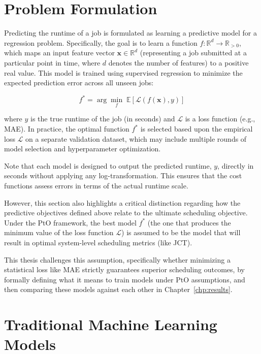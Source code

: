\section{Problem Formulation}
\label{sec:formulation}

Predicting the runtime of a job is formulated as learning a predictive model for a regression problem. Specifically, the goal is to learn a function $f: \mathbb{R}^d \rightarrow \mathbb{R}_{>0}$, which maps an input feature vector $\mathbf{x} \in \mathbb{R}^d$ (representing a job submitted at a particular point in time, where $d$ denotes the number of features) to a positive real value. This model is trained using supervised regression to minimize the expected prediction error across all unseen jobs:

\begin{equation}
    f^* = \arg\min_f \; \mathbb{E}\left[\mathcal{L}(f(\mathbf{x}), y)\right]
\end{equation}

where $y$ is the true runtime of the job (in seconds) and $\mathcal{L}$ is a loss function (e.g., MAE). In practice, the optimal function $f^*$ is selected based upon the empirical loss $\mathcal{L}$ on a separate validation dataset, which may include multiple rounds of model selection and hyperparameter optimization.

\clearpage
Note that each model is designed to output the predicted runtime, $y$, directly in seconds without applying any log-transformation. This ensures that the cost functions assess errors in terms of the actual runtime scale.

However, this section also highlights a critical distinction regarding how the predictive objectives defined above relate to the ultimate scheduling objective. Under the PtO framework, the best model $f^*$ (the one that produces the minimum value of the loss function $\mathcal{L}$) is assumed to be the model that will result in optimal system-level scheduling metrics (like JCT).

This thesis challenges this assumption, specifically whether minimizing a statistical loss like MAE strictly guarantees superior scheduling outcomes, by formally defining what it means to train models under PtO assumptions, and then comparing these models against each other in Chapter~\ref{chp:results}.

\section{Traditional Machine Learning Models}
\label{sec:treebased}

